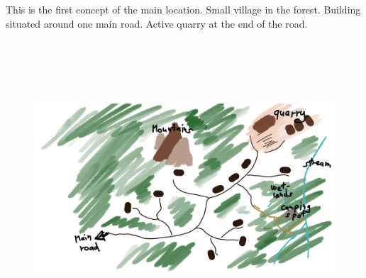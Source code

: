 \documentclass[a4paper,10pt,english]{article}
\begin{document}
This is the first concept of the main location. Small village in the forest. Building situated around one main road. Active quarry at the end of the road.
\begin{figure}[h]
\includegraphics[width=18cm, height=11cm]{Map.png}
\end{figure}
\end{document}
